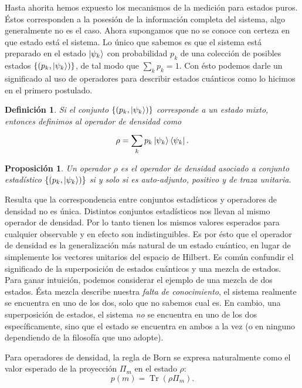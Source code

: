 \documentclass[a4paper,11pt]{report}
\DeclareMathOperator{\Tr}{Tr}
\newtheorem{definition}{Definición}
\newtheorem{proposition}{Proposición}
\begin{document}
  Hasta ahorita hemos expuesto los mecanismos de la medición
  para estados puros. Éstos corresponden a la posesión de la
  información completa del sistema, algo generalmente no es
  el caso. Ahora supongamos que no se conoce con certeza en
  que estado está el sistema. Lo único que sabemos es que el
  sistema está preparado en el estado $\ket{\psi_k}$ con
  probabilidad $p_k$ de una colección de posibles estados
  $\{(p_k, \ket{\psi_k})\}$, de tal modo que $\sum_{k}^{}
  p_k = 1$. Con ésto podemos darle un significado al uso de
  operadores para describir estados cuánticos como lo
  hicimos en el primero postulado.
  \begin{definition}
    \label{def:density_operator}
    Si el conjunto $\{(p_k, \ket{\psi_k})\}$ corresponde a
    un estado mixto, entonces definimos al operador de
    densidad como 
    \begin{equation}
      \rho 
      = \sum_{k}^{} p_k \ket{\psi_k}\bra{\psi_k}.
    \end{equation}
  \end{definition}
  \begin{proposition}
    Un operador $\rho$ es el operador de densidad asociado a
    conjunto estadístico $\{(p_k, \ket{\psi_k})\}$ si y solo
    si es auto-adjunto, positivo y de traza unitaria.
  \end{proposition}
  Resulta que la correspondencia entre conjuntos
  estadísticos y operadores de densidad no es única.
  Distintos conjuntos estadísticos nos llevan al mismo
  operador de densidad. Por lo tanto tienen los mismos
  valores esperados para cualquier observable y en efecto
  son indistinguibles. Es por ésto que el operador de
  densidad es la generalización más natural de un estado
  cuántico, en lugar de simplemente los vectores unitarios
  del espacio de Hilbert. Es común confundir el significado
  de la superposición de estados cuánticos y una mezcla de
  estados. Para ganar intuición, podemos considerar el
  ejemplo de una mezcla de dos estados. Ésta mezcla describe
  nuestra \textit{falta de conocimiento}, el sistema
  realmente se encuentra en uno de los dos, solo que no
  sabemos cual es. En cambio, una superposición de estados,
  el sistema \textit{no} se encuentra en uno de los dos
  específicamente, sino que el estado se encuentra en ambos
  a la vez (o en ninguno dependiendo de la filosofía que uno
  adopte).

  Para operadores de densidad, la regla de Born se expresa
  naturalmente como el valor esperado de la proyección
  $\Pi_m$ en el estado $\rho$:
  \begin{equation}
    p(m) = \Tr\left( \rho \Pi_m \right). 
  \end{equation}
\end{document}
